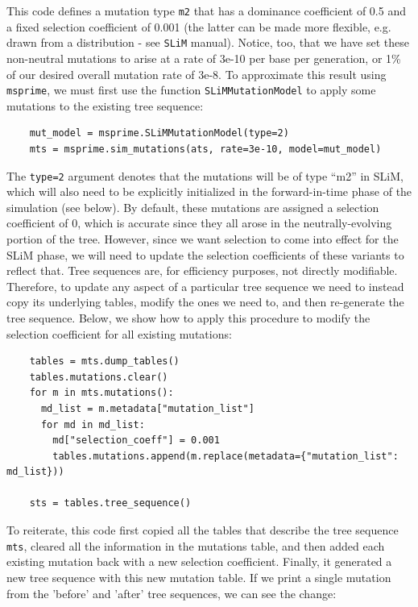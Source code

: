 \documentclass[12pt]{article}
\newcommand{\msprime}[0]{\texttt{msprime}\xspace}
\newcommand{\slim}[0]{\texttt{SLiM}\xspace}
\begin{document}
This code defines a mutation type \verb|m2| that has a dominance coefficient of 0.5 and a fixed selection
coefficient of 0.001 (the latter can be made more flexible, e.g. drawn from a distribution - see \slim manual).
Notice, too, that we have set these non-neutral mutations to arise at a rate of 3e-10 per base per generation,
or 1\% of our desired overall mutation rate of 3e-8. To approximate this result using \msprime, we must first
use the function \verb|SLiMMutationModel| to apply some mutations to the existing tree sequence:

\begin{listing}[H]
  \begin{verbatim}
    mut_model = msprime.SLiMMutationModel(type=2)
    mts = msprime.sim_mutations(ats, rate=3e-10, model=mut_model)
  \end{verbatim}
\end{listing}

The \verb|type=2| argument denotes that the mutations will be of type ``m2'' in SLiM, which will also
need to be explicitly initialized in the forward-in-time phase of the simulation (see below).
By default, these mutations are assigned a selection coefficient of 0, which is accurate since they
all arose in the neutrally-evolving portion of the tree. However, since we want selection to come into
effect for the SLiM phase, we will need to update the selection coefficients of these variants to reflect that.
Tree sequences are, for efficiency purposes, not directly modifiable. Therefore, to update any aspect of
a particular tree sequence we need to instead copy its underlying tables, modify the ones we need to,
and then re-generate the tree sequence. Below, we show how to apply this procedure to modify the
selection coefficient for all existing mutations:

\begin{listing}[H]
  \begin{verbatim}
    tables = mts.dump_tables()
    tables.mutations.clear()
    for m in mts.mutations():
      md_list = m.metadata["mutation_list"]
      for md in md_list:
        md["selection_coeff"] = 0.001
        tables.mutations.append(m.replace(metadata={"mutation_list": md_list}))

    sts = tables.tree_sequence()
  \end{verbatim}
\end{listing}

To reiterate, this code first copied all the tables that describe the tree sequence \verb|mts|, cleared all the
information in the mutations table, and then added each existing mutation back with a new selection
coefficient. Finally, it generated a new tree sequence with this new mutation table. If we print a single
mutation from the 'before' and 'after' tree sequences, we can see the change:
\end{document}
